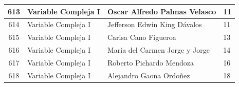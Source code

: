 {\begin{longtable}{|c|p{6.5cm}|p{5cm}|p{1.5cm}|}
  613 & Variable Compleja I & Oscar Alfredo Palmas Velasco & 11 \\ \hline 
  614 & Variable Compleja I & Jefferson Edwin King Dávalos & 11 \\ \hline 
  615 & Variable Compleja I & Carisa Cano Figueroa & 13 \\ \hline 
  616 & Variable Compleja I & María del Carmen Jorge y Jorge & 14 \\ \hline 
  617 & Variable Compleja I & Roberto Pichardo Mendoza & 16 \\ \hline 
  618 & Variable Compleja I & Alejandro Gaona Ordoñez & 18 \\ \hline 
\end{longtable}}







\renewcommand\lstlistingname{Código} %
\renewcommand\lstlistlistingname{Códigos} %

